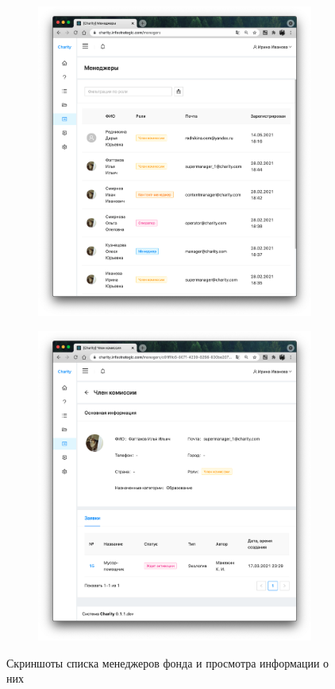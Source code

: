\documentclass[a4paper,12pt,reqno]{article}
\begin{document}
	\begin{figure}[H]
	    \centering
		\begin{subfigure}[b]{0.475\linewidth}
			\includegraphics[width=\linewidth]{img/ro/managers.png}
		\end{subfigure}
		\begin{subfigure}[b]{0.475\linewidth}
			\includegraphics[width=\linewidth]{img/ro/manager_page.png}
		\end{subfigure}
		\caption{Скриншоты списка менеджеров фонда и просмотра информации о них}
		\label{pic: managers}
	\end{figure}
	
\end{document}
